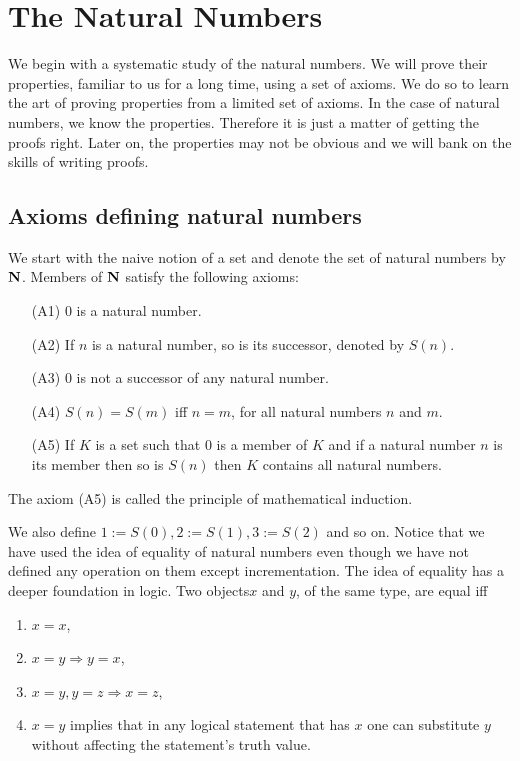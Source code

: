 \chapter{The Natural Numbers}\label{c1}
We begin with a systematic study of the natural numbers. We will prove their
properties, familiar to us for a long time, using a set of axioms. We do so
to learn the art of proving properties from a limited set of axioms. In the 
case of natural numbers, we know the properties. Therefore it is just a 
matter of getting the proofs right. Later on, the properties may not be 
obvious and we will bank on the skills of writing proofs.

\section{Axioms defining natural numbers}\label{c1s1}
We start with the naive notion of a set and denote the set of natural 
numbers by $\mathbf{N}$. Members of $\mathbf{N}$ satisfy the following axioms:
\begin{enumerate}
\item[(A1)] $0$ is a natural number.
\item[(A2)] If $n$ is a natural number, so is its successor, denoted by 
$S(n)$.
\item[(A3)] $0$ is not a successor of any natural number.
\item[(A4)] $S(n) = S(m)$ iff $n = m$, for all natural numbers $n$ and $m$.
\item[(A5)] If $K$ is a set such that $0$ is a member of $K$ and if a 
natural number $n$ is its member then so is $S(n)$ then $K$ contains all 
natural numbers.
\end{enumerate}
The axiom (A5) is called the principle of mathematical induction.

We also define $1 := S(0), 2 := S(1), 3 := S(2)$ and so on. Notice that
we have used the idea of equality of natural numbers even though we have
not defined any operation on them except incrementation. The idea of 
equality has a deeper foundation in logic. Two objects$x$ and $y$, of the 
same type, are equal iff
\begin{enumerate}
\item $x = x$,
\item $x = y \Rightarrow y = x$,
\item $x = y, y = z \Rightarrow x = z$,
\item $x = y$ implies that in any logical statement that has $x$ one can 
substitute $y$ without affecting the statement's truth value.
\end{enumerate}

